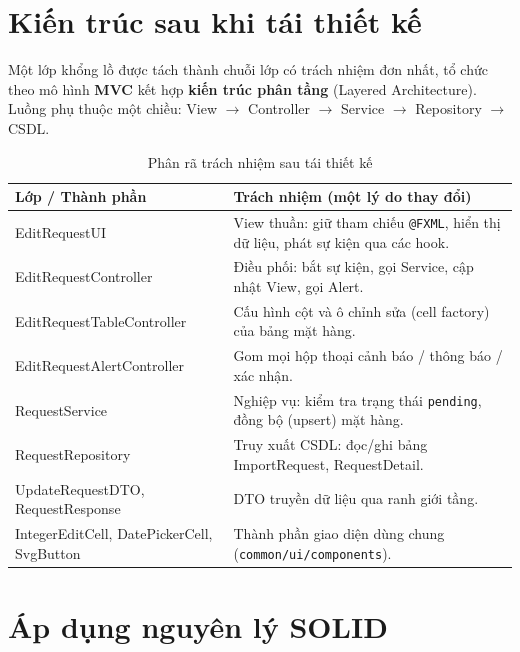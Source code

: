 \documentclass[12pt,a4paper]{article}
\begin{document}
\section{Kiến trúc sau khi tái thiết kế}

Một lớp khổng lồ được tách thành chuỗi lớp có trách nhiệm đơn nhất, tổ chức theo
mô hình \textbf{MVC} kết hợp \textbf{kiến trúc phân tầng} (Layered
Architecture). Luồng phụ thuộc một chiều: View $\rightarrow$ Controller
$\rightarrow$ Service $\rightarrow$ Repository $\rightarrow$ CSDL.

\begin{table}[H]
\centering
\caption{Phân rã trách nhiệm sau tái thiết kế}
\begin{tabularx}{\textwidth}{>{\ttfamily}l Y}
\hline
{}
\normalfont\textbf{Lớp / Thành phần} & \textbf{Trách nhiệm (một lý do thay đổi)} \\
\hline
EditRequestUI               & View thuần: giữ tham chiếu \texttt{@FXML}, hiển thị dữ liệu, phát sự kiện qua các hook. \\
EditRequestController       & Điều phối: bắt sự kiện, gọi Service, cập nhật View, gọi Alert. \\
EditRequestTableController  & Cấu hình cột và ô chỉnh sửa (cell factory) của bảng mặt hàng. \\
EditRequestAlertController  & Gom mọi hộp thoại cảnh báo / thông báo / xác nhận. \\
RequestService              & Nghiệp vụ: kiểm tra trạng thái \texttt{pending}, đồng bộ (upsert) mặt hàng. \\
RequestRepository           & Truy xuất CSDL: đọc/ghi bảng ImportRequest, RequestDetail. \\
UpdateRequestDTO, RequestResponse & DTO truyền dữ liệu qua ranh giới tầng. \\
IntegerEditCell, DatePickerCell, SvgButton & Thành phần giao diện dùng chung (\texttt{common/ui/components}). \\
\hline
\end{tabularx}
\end{table}

\section{Áp dụng nguyên lý SOLID}
\end{document}
